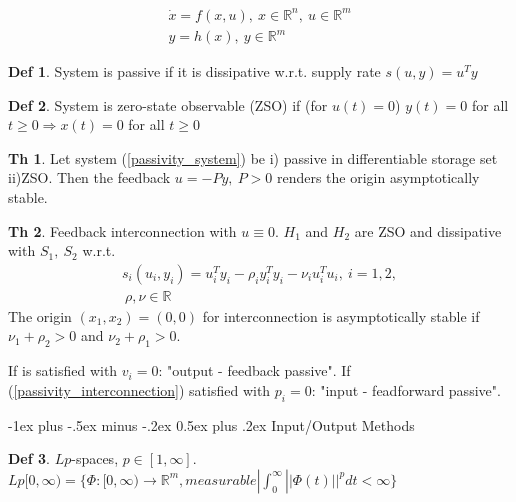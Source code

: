 \documentclass[9pt,landscape]{article}
\makeatletter
\theoremstyle{definition}
\newtheorem*{Theorem}{Th}
\newtheorem*{Definition}{Def}
\renewcommand{\section}{\@startsection{section}{1}{0mm}%
                                {-1ex plus -.5ex minus -.2ex}%
                                {0.5ex plus .2ex}%
                                {\normalfont\large\bfseries}}
\makeatother
\begin{document}
\begin{multicols}{4}
\begin{equation}\label{passivity_system}
\begin{split}
\dot{x} = f(x,u), \ x \in \mathbb{R}^n, \ u \in \mathbb{R}^m \\
y = h(x), \ y \in \mathbb{R}^m
\end{split}
\end{equation}

\begin{Definition}
System is passive if it is dissipative w.r.t. supply rate $s(u,y) = u^Ty$
\end{Definition}

\begin{Definition}
System is zero-state observable (ZSO) if (for $u(t)=0$) $y(t)=0$ for all $t \geq 0 \Rightarrow x(t) = 0$ for all $t \geq 0$
\end{Definition}

\begin{Theorem}
Let system (\ref{passivity_system}) be i) passive in differentiable storage set ii)ZSO. Then the feedback $u=-Py, \ P > 0$ renders the origin asymptotically stable.
\end{Theorem}

\begin{Theorem}
Feedback interconnection with $u \equiv 0$. $H_1$ and $H_2$ are ZSO and dissipative with $S_1, \ S_2$ w.r.t.
\begin{equation*}
\begin{split}
s_i(u_i,y_i) = u_i^Ty_i - \rho_iy_i^Ty_i - \nu_iu_i^Tu_i, \ i=1,2, \\ 
\ \rho,\nu \in \mathbb{R}
\end{split}
\end{equation*}
The origin $(x_1,x_2) = (0,0)$ for interconnection is asymptotically stable if $\nu_1 + \rho_2 > 0$ and $\nu_2 + \rho_1 > 0$.
\end{Theorem}

If is satisfied with $v_i=0$: "output - feedback passive". If (\ref{passivity_interconnection}) satisfied with $p_i=0$: "input - feadforward passive".

\section{Input/Output Methods}

\begin{Definition}
 $Lp$-spaces, $p\in[1,\infty]$. 
 $Lp[0,\infty) = \{\Phi:[0,\infty)\rightarrow\mathbb{R}^m, measurable|
  \int_0^\infty ||\Phi(t)||^p dt < \infty\}$
\end{Definition}


\end{multicols}
\end{document}
